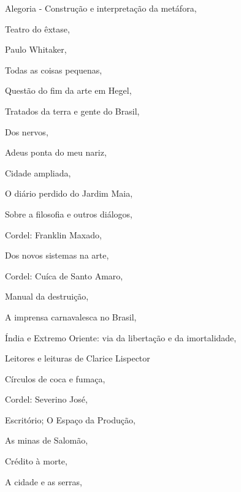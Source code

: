 \begin{multicols}{2}
\begin{enumerate}
{\item Alegoria - Construção e interpretação da metáfora, {}
\item Teatro do êxtase, {}
\item Paulo Whitaker, {}
\item Todas as coisas pequenas, {}
\item Questão do fim da arte em Hegel, {}
\item Tratados da terra e gente do Brasil, {}
\item Dos nervos, {}
\item Adeus ponta do meu nariz, {}
\item Cidade ampliada, {}
\item O diário perdido do Jardim Maia, {}
\item Sobre a filosofia e outros diálogos, {}
\item Cordel: Franklin Maxado, {}
\item Dos novos sistemas na arte, {}
\item Cordel: Cuíca de Santo Amaro, {}
\item Manual da destruição, {}
\item A imprensa carnavalesca no Brasil, {}
\item Índia e Extremo Oriente: via da libertação e da imortalidade, {}
\item Leitores e leituras de Clarice Lispector
\item Círculos de coca e fumaça, {}
\item Cordel: Severino José, {}
\item Escritório; O Espaço da Produção, {}
\item As minas de Salomão, {}
\item Crédito à morte, {}
\item A cidade e as serras, {}
}
\end{enumerate}
\end{multicols}
